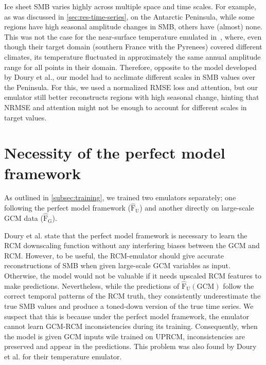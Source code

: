 \documentclass[a4paper,11pt,oneside]{report}
\begin{document}
Ice sheet SMB varies highly across multiple space and time scales. For example, as was discussed in \autoref{sec:res-time-series}, on the Antarctic Peninsula, while some regions have high seasonal amplitude changes in SMB, others have (almost) none. This was not the case for the near-surface temperature emulated in~\cite{Doury}, where, even though their target domain (southern France with the Pyrenees) covered different climates, its temperature fluctuated in approximately the same annual amplitude range for all points in their domain. Therefore, opposite to the model developed by Doury et al., our model had to acclimate different scales in SMB values over the Peninsula. For this, we used a normalized RMSE loss and attention, but our emulator still better reconstructs regions with high seasonal change, hinting that NRMSE and attention might not be enough to account for different scales in target values. 

\section{Necessity of the perfect model framework}\label{sec:disc-perfect-model}

As outlined in \autoref{subsec:training}, we trained two emulators separately; one following the perfect model framework ($\mathrm{\hat{F}_{U}}$) and another directly on large-scale GCM data ($\mathrm{\hat{F}_{G}}$). 


Doury et al. state that the perfect model framework is necessary to learn the RCM downscaling function without any interfering biases between the GCM and RCM. However, to be useful, the RCM-emulator should give accurate reconstructions of SMB when given large-scale GCM variables as input. Otherwise, the model would not be valuable if it needs upscaled RCM features to make predictions. Nevertheless, while the predictions of $\mathrm{\hat{F}_{U}(GCM)}$ follow the correct temporal patterns of the RCM truth, they consistently underestimate the true SMB values and produce a toned-down version of the true time series. We suspect that this is because under the perfect model framework, the emulator cannot learn GCM-RCM inconsistencies during its training. Consequently, when the model is given GCM inputs wile trained on UPRCM, inconsistencies are preserved and appear in the predictions. This problem was also found by Doury et al. for their temperature emulator. 
\end{document}
